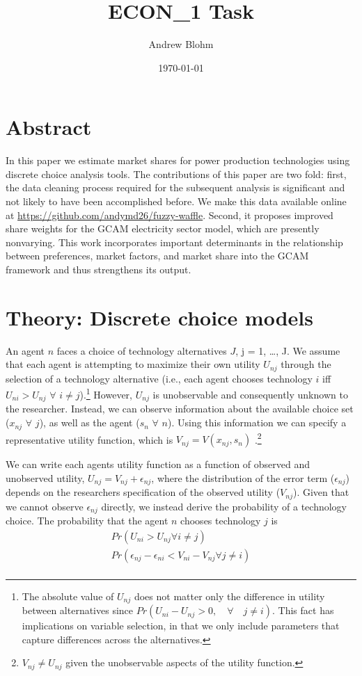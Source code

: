\documentclass[10pt]{amsart}
\title{ECON\_1 Task}
\author{Andrew Blohm}
\date{\today}
\begin{document}
\maketitle

\section{Abstract}
In this paper we estimate market shares for power production technologies using discrete choice analysis tools. 
The contributions of this paper are two fold: first, the data cleaning process required for the subsequent analysis is significant and not likely to have been accomplished before.
We make this data available online at \url{https://github.com/andymd26/fuzzy-waffle}. 
Second, it proposes improved share weights for the GCAM electricity sector model, which are presently nonvarying. 
This work incorporates important determinants in the relationship between preferences, market factors, and market share into the GCAM framework and thus strengthens its output.  

\section{Theory: Discrete choice models}
An agent $n$ faces a choice of technology alternatives $J$, j = 1, \ldots, J.  
We assume that each agent is attempting to maximize their own utility $U_{nj}$ through the selection of a technology alternative (i.e., each agent chooses technology $i$ iff $U_{ni} > U_{nj}$ $\forall$ $i \neq j$).\footnote{The absolute value of $U_{nj}$ does not matter only the difference in utility between alternatives since $Pr(U_{ni} -U_{nj} > 0, \quad \forall \quad j \neq i)$.
This fact has implications on variable selection, in that we only include parameters that capture differences across the alternatives.}
However, $U_{nj}$ is unobservable and consequently unknown to the researcher.
Instead, we can observe information about the available choice set ($x_{nj}$ $\forall$ $j$), as well as the agent ($s_{n}$ $\forall$ $n$).
Using this information we can specify a representative utility function, which is $V_{nj} = V(x_{nj}, s_{n})$ \parencite{train2009discrete}.\footnote{$V_{nj} \neq U_{nj}$ given the unobservable aspects of the utility function.} 

We can write each agents utility function as a function of observed and unobserved utility, $U_{nj} = V_{nj} + \epsilon_{nj}$, where the distribution of the error term ($\epsilon_{nj}$) depends on the researchers specification of the observed utility ($V_{nj}$). 
Given that we cannot observe $\epsilon_{nj}$ directly, we instead derive the probability of a technology choice. 
The probability that the agent $n$ chooses technology $j$ is 
\begin{equation}
\begin{split}
Pr(U_{ni} > U_{nj} \forall i \neq j) \\
Pr(\epsilon_{nj} - \epsilon_{ni} < V_{ni} - V_{nj} \forall j \neq i) \\
\end{split}
\end{equation}
\end{document}
